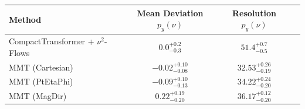     \begin{tabular}{lccc}
        \toprule
        Method & Mean Deviation $p_{y}(\nu)$ & Resolution $p_{y}(\nu)$ \\
        \midrule
        CompactTransformer + $\nu^2$-Flows & $0.0^{+0.2}_{-0.3}$ & $51.4^{+0.7}_{-0.5}$ \\
        MMT (Cartesian) & $-0.02^{+0.10}_{-0.08}$ & $32.53^{+0.26}_{-0.19}$ \\
        MMT (PtEtaPhi) & $-0.09^{+0.10}_{-0.13}$ & $34.22^{+0.24}_{-0.20}$ \\
        MMT (MagDir) & $0.22^{+0.19}_{-0.20}$ & $36.17^{+0.12}_{-0.20}$ \\
        \bottomrule
    \end{tabular}